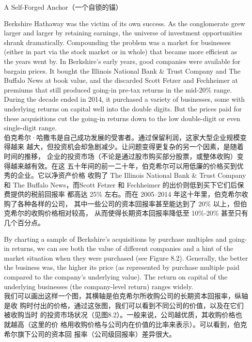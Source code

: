 \begin{section}{A Self-Forged Anchor（一个自锁的锚）}

\begin{verseparallel}
  {
    Berkshire Hathaway was the victim of its own success. As the conglomerate
    grew larger and larger by retaining earnings, the universe of investment
    opportunities shrank dramatically. Compounding the problem was a market
    for businesses (either in part via the stock market or in whole) that
    became more efficient as the years went by. In Berkshire's early years,
    good companies were available for bargain prices. It bought the Illinois
    National Bank \& Trust Company and The Buffalo News at book value, and the
    discarded Scott Fetzer and Fechheimer at premiums that still produced
    going-in pre-tax returns in the mid-20\% range. During the decade ended in
    2014, it purchased a variety of businesses, some with underlying returns
    on capital well into the double digits. But the prices paid for these
    acquisitions cut the going-in returns down to the low double-digit or even
    single-digit range. \\
  }
  {
    伯克希尔·哈撒韦是自己成功发展的受害者。通过保留利润，这家大型企业规模变得越来
    越大，但投资机会却急剧减少。让问题变得更复杂的另一个因素，是随着时间的推移，
    企业的投资市场（不论是通过股市购买部分股票，或整体收购）变得越来越有效。在这
    五十年间的前一二十年，伯克希尔可以用低廉的价格买到优秀的企业。它以净资产价格
    收购了 The Illinois National Bank \& Trust Company 和 The Buffalo
    News，而Scott Fetzer 和 Fechheimer 的出价则低到买下它们后保费提供的税前回报率
    都高达 25\% 左右。而在 2005--2014 年这十年里，伯克希尔收购了各种各样的公司，
    其中一些公司的资本回报率甚至能达到了 20\% 以上，但伯克希尔的收购价格相对较高，
    从而使得长期资本回报率降低至 10\%-20\% 甚至只有几个百分点。
  }
\end{verseparallel}

\begin{verseparallel}
  {
    By charting a sample of Berkshire's acquisitions by purchase multiples and
    going-in returns, we can see both the value of different companies and a
    hint of the market situation when they were purchased (see Figure 8.2).
    Generally, the better the business was, the higher its price (as represented
    by purchase multiple paid compared to the company's underlying value). The
    return on capital of the underlying businesses (the company-level return)
    ranges widely. \\
  }
  {
    我们可以画出这样一个图，其横轴是伯克希尔所收购公司的长期资本回报率，纵轴是收
    购时付出的价格，通过这张图，我们可以看到不同公司的价值，以及在它们被收购当时
    的投资市场状况（见图8.2）。一般来说，公司越优质，其收购价格也就越高（这里的价
    格用收购价格与公司内在价值的比率来表示）。可以看到，伯克希尔旗下公司的资本回
    报率（公司级回报率）差异很大。
  }


\end{verseparallel}
\end{section}
